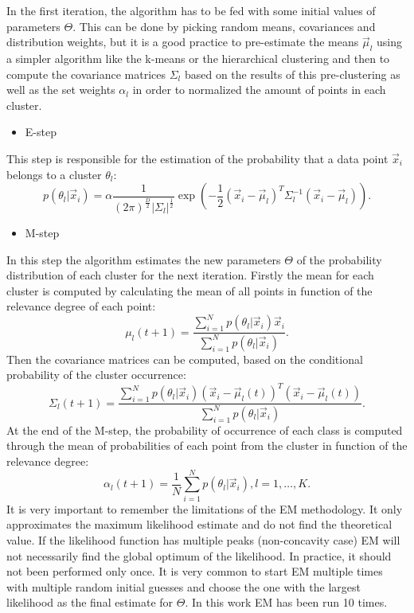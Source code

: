 \documentclass[11pt]{article}
\begin{document}
In the first iteration, the algorithm has to be fed with some initial values of parameters $\Theta$. This can be done by picking random means, covariances and distribution weights, but it is a good practice to pre-estimate the means $\overrightarrow{\mu}_l$  using a simpler algorithm like the k-means or the hierarchical clustering  and then to compute the covariance matrices $\Sigma_l$ based on the results of this pre-clustering as well as the set weights $\alpha_l$ in order to normalized the amount of points in each cluster.
 \begin{itemize}
     \item E-step
 \end{itemize}
This step is responsible for the estimation of the probability that a data point $\overrightarrow{x}_i$  belongs to a cluster $\theta_l$:
\begin{equation}
    p(\theta_l|\overrightarrow{x}_i)=\alpha \frac{1}{(2\pi)^{\frac{D}{2}}|\Sigma_l|^{\frac{1}{2}}}\exp\left(-\frac{1}{2}(\overrightarrow{x}_i-\overrightarrow{\mu}_l)^T\Sigma_l^{-1}(\overrightarrow{x}_i-\overrightarrow{\mu}_l)\right).
\end{equation}
    \begin{itemize}
        \item M-step
    \end{itemize}
In this step the algorithm estimates the new parameters $\Theta$ of the probability distribution of each cluster for the next iteration. Firstly the mean for each cluster is computed by calculating the mean of all points in function of the relevance degree of each point:
\begin{equation}
    \mu_l(t+1)=\frac{\sum_{i=1}^N p(\theta_l|\overrightarrow{x}_i)\overrightarrow{x}_i}{\sum_{i=1}^N p(\theta_l|\overrightarrow{x}_i)}.
\end{equation}
Then the covariance matrices can be computed, based on the conditional probability of the cluster occurrence:
\begin{equation}
    \Sigma_l(t+1)=\frac{\sum_{i=1}^N p(\theta_l|\overrightarrow{x}_i)(\overrightarrow{x}_i-\overrightarrow{\mu}_l(t))^T(\overrightarrow{x}_i-\overrightarrow{\mu}_l(t))}{\sum_{i=1}^N p(\theta_l|\overrightarrow{x}_i)}.
\end{equation}
At the end of the M-step, the probability of occurrence of each class is computed through the mean of probabilities of each point from the cluster in function of the relevance degree:
\begin{equation}
    \alpha_l(t+1)=\frac{1}{N}\sum_{i=1}^{N}p(\theta_l|\overrightarrow{x}_i), l=1,\dots,K.
\end{equation}
It is very important to remember the limitations of the EM methodology. It only approximates the maximum likelihood estimate and do not find the theoretical value. If the likelihood function has multiple peaks (non-concavity case) EM will not necessarily find the global optimum of the likelihood. In practice, it should not been performed only once. It is very common to start EM multiple times with multiple random initial guesses and choose the one with the largest likelihood as the final estimate for $\Theta$. In this work EM has been run 10 times.
%
%
\end{document}
